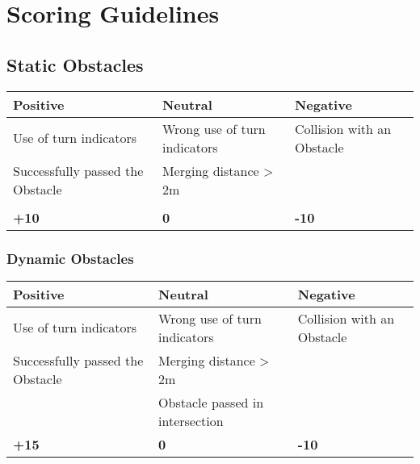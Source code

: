 {\section{Scoring Guidelines}
\label{obstacle_scoring_guidelines}

\subsection*{Static Obstacles}
\begin{table}[H]
    \begin{tabularx}{\textwidth}{XXX}
        \toprule
        \textbf{Positive}                & \textbf{Neutral}             & \textbf{Negative}          \\
        \midrule
        Use of turn indicators           & Wrong use of turn indicators & Collision with an Obstacle \\
        Successfully passed the Obstacle & Merging distance > 2m        &                            \\
                                         &                              &                            \\
        \topstrut
        \textbf{+10}                     & \textbf{0}                   & \textbf{-10}               \\
        \bottomrule
    \end{tabularx}
\end{table}

\subsubsection*{Dynamic Obstacles}
\begin{table}[H]
    \begin{tabularx}{\textwidth}{XXX}
        \toprule
        \textbf{Positive}                & \textbf{Neutral}                & \textbf{Negative}          \\
        \midrule
        Use of turn indicators           & Wrong use of turn indicators    & Collision with an Obstacle \\
        Successfully passed the Obstacle & Merging distance > 2m           &                            \\
                                         & Obstacle passed in intersection &                            \\
        \topstrut
        \textbf{+15}                     & \textbf{0}                      & \textbf{-10}               \\
        \bottomrule
    \end{tabularx}
\end{table}

}
